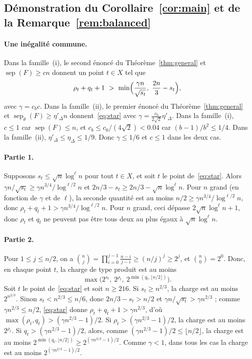 \documentclass[11pt,a4paper]{article}
\theoremstyle{definition}
\theoremstyle{remark}
\newcommand{\sep}{\operatorname{sep}}
\newcommand{\sepw}{\operatorname{sep}_{\theta}}
\begin{document}
\subsection{Démonstration du Corollaire~\ref{cor:main} et de la Remarque~\ref{rem:balanced}}
\label{sec:proofcor}

\paragraph{Une inégalité commune.} Dans la famille~(i), le second énoncé du
Théorème~\ref{thm:general} et $\sep(F)\ge cn$ donnent un point $t\in X$ tel que
\begin{equation}\label{eq:star}
\rho_t+q_t+1\ >\ \min\Bigl(\frac{\gamma n}{\sqrt{s_t}},\ \frac{2n}{3}-s_t\Bigr),
\end{equation}
avec $\gamma=c_bc$. Dans la famille~(ii), le premier énoncé du Théorème~\ref{thm:general} et
$\sepw(F)\ge\eta'_\Delta n$ donnent~\eqref{eq:star} avec
$\gamma=\frac{c_0}{2\sqrt2}\eta'_\Delta$. Dans la famille~(i), $c\le1$ car $\sep(F)\le n$,
et $c_b\le c_0/(4\sqrt2)<0.04$ car $(b-1)/b^2\le1/4$. Dans la famille~(ii),
$\eta'_\Delta\le\eta_\Delta\le1/9$. Donc $\gamma\le1/6$ et $c\le1$ dans les deux cas.

\paragraph{Partie 1.} Supposons $s_t\le\sqrt n\log^\ell n$ pour tout $t\in X$, et soit $t$
le point de~\eqref{eq:star}. Alors
$\gamma n/\sqrt{s_t}\ge\gamma n^{3/4}/\log^{\ell/2}n$ et
$2n/3-s_t\ge2n/3-\sqrt n\log^\ell n$. Pour $n$ grand (en fonction de $\gamma$ et de $\ell$),
la seconde quantité est au moins $n/2\ge\gamma n^{3/4}/\log^{\ell/2}n$, donc
$\rho_t+q_t+1>\gamma n^{3/4}/\log^{\ell/2}n$. Pour $n$ grand, ceci dépasse
$2\sqrt n\log^\ell n+1$, donc $\rho_t$ et $q_t$ ne peuvent pas être tous deux au plus égaux
à $\sqrt n\log^\ell n$.

\paragraph{Partie 2.} Pour $1\le j\le n/2$, on a
$\binom nj=\prod_{i=0}^{j-1}\frac{n-i}{j-i}\ge(n/j)^j\ge2^j$, et $\binom n0=2^0$. Donc, en
chaque point $t$, la charge de type produit est au moins
\begin{equation}\label{eq:charge}
\max\bigl(2^{s_t},\ 2^{\rho_t},\ 2^{\min(q_t,\lfloor n/2\rfloor)}\bigr).
\end{equation}
Soit $t$ le point de~\eqref{eq:star} et soit $n\ge216$. Si $s_t\ge n^{2/3}$, la charge est
au moins $2^{n^{2/3}}$. Sinon $s_t<n^{2/3}\le n/6$, donc $2n/3-s_t>n/2$ et
$\gamma n/\sqrt{s_t}>\gamma n^{2/3}$ ; comme $\gamma n^{2/3}\le n/2$, \eqref{eq:star} donne
$\rho_t+q_t+1>\gamma n^{2/3}$, d'où $\max(\rho_t,q_t)>(\gamma n^{2/3}-1)/2$. Si
$\rho_t>(\gamma n^{2/3}-1)/2$, la charge est au moins $2^{\rho_t}$. Si
$q_t>(\gamma n^{2/3}-1)/2$, alors, comme $(\gamma n^{2/3}-1)/2\le\lfloor n/2\rfloor$, la
charge est au moins $2^{\min(q_t,\lfloor n/2\rfloor)}\ge2^{(\gamma n^{2/3}-1)/2}$. Comme
$\gamma<1$, dans tous les cas la charge est au moins $2^{(\gamma n^{2/3}-1)/2}$.
\end{document}
